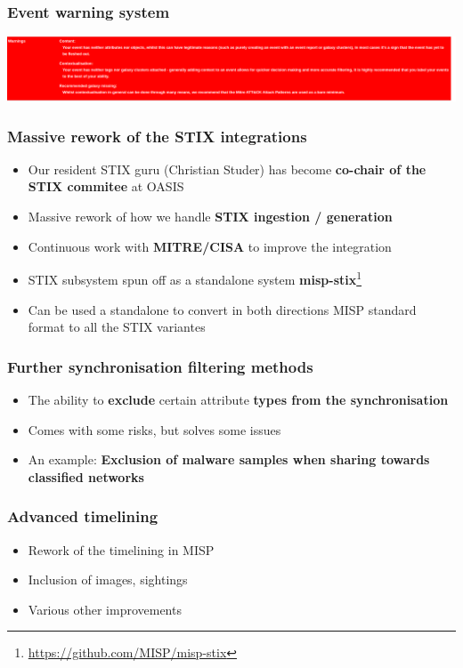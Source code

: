 \begin{frame}
\frametitle{Event warning system}
\includegraphics[scale=0.3]{images/warnings.png}
\end{frame}


\begin{frame}
  \frametitle{Massive rework of the STIX integrations}
  \begin{itemize}
     \item Our resident STIX guru (Christian Studer) has become {\bf co-chair of the STIX commitee} at OASIS
     \item Massive rework of how we handle {\bf STIX ingestion / generation}
     \item Continuous work with {\bf MITRE/CISA} to improve the integration
     \item STIX subsystem spun off as a standalone system {\bf misp-stix}\footnote{\url{https://github.com/MISP/misp-stix}}
     \item Can be used a standalone to convert in both directions MISP standard format to all the STIX variantes
  \end{itemize}
\end{frame}

\begin{frame}
  \frametitle{Further synchronisation filtering methods}
  \begin{itemize}
     \item The ability to {\bf exclude} certain attribute {\bf types from the synchronisation}
     \item Comes with some risks, but solves some issues
     \item An example: {\bf Exclusion of malware samples when sharing towards classified networks}
  \end{itemize}
\end{frame}

\begin{frame}
  \frametitle{Advanced timelining}
  \begin{itemize}
     \item Rework of the timelining in MISP
     \item Inclusion of images, sightings
     \item Various other improvements
  \end{itemize}
\end{frame}

